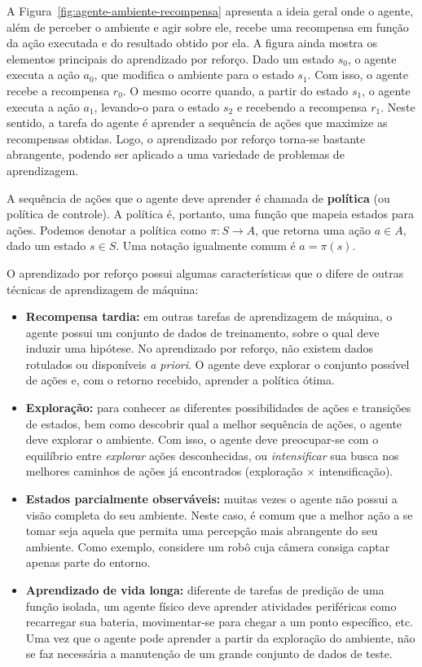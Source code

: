 A Figura~\ref{fig:agente-ambiente-recompensa} apresenta a ideia geral onde o agente, além de perceber o ambiente e agir sobre ele, recebe uma recompensa em função da ação executada e do resultado obtido por ela. A figura ainda mostra os elementos principais do aprendizado por reforço. Dado um estado $s_0$, o agente executa a ação $a_0$, que modifica o ambiente para o estado $s_1$. Com isso, o agente recebe a recompensa $r_0$. O mesmo ocorre quando, a partir do estado $s_1$, o agente executa a ação $a_1$, levando-o para o estado $s_2$ e recebendo a recompensa $r_1$. Neste sentido, a tarefa do agente é aprender a sequência de ações que maximize as recompensas obtidas. Logo, o aprendizado por reforço torna-se bastante abrangente, podendo ser aplicado a uma variedade de problemas de aprendizagem.

A sequência de ações que o agente deve aprender é chamada de \textbf{política} (ou política de controle). A política é, portanto, uma função que mapeia estados para ações. Podemos denotar a política como $\pi : S \rightarrow A$, que retorna uma ação $a \in A$, dado um estado $s \in S$. Uma notação igualmente comum é $a = \pi(s)$.

O aprendizado por reforço possui algumas características que o difere de outras técnicas de aprendizagem de máquina:

\begin{itemize}
	\item \textbf{Recompensa tardia:} em outras tarefas de aprendizagem de máquina, o agente possui um conjunto de dados de treinamento, sobre o qual deve induzir uma hipótese. No aprendizado por reforço, não existem dados rotulados ou disponíveis \textit{a priori}. O agente deve explorar o conjunto possível de ações e, com o retorno recebido, aprender a política ótima.
	
	\item \textbf{Exploração:} para conhecer as diferentes possibilidades de ações e transições de estados, bem como descobrir qual a melhor sequência de ações, o agente deve explorar o ambiente. Com isso, o agente deve preocupar-se com o equilíbrio entre \textit{explorar} ações desconhecidas, ou \textit{intensificar} sua busca nos melhores caminhos de ações já encontrados (exploração $\times$ intensificação).
	
	\item \textbf{Estados parcialmente observáveis:} muitas vezes o agente não possui a visão completa do seu ambiente. Neste caso, é comum que a melhor ação a se tomar seja aquela que permita uma percepção mais abrangente do seu ambiente. Como exemplo, considere um robô cuja câmera consiga captar apenas parte do entorno.
	
	\item \textbf{Aprendizado de vida longa:} diferente de tarefas de predição de uma função isolada, um agente físico deve aprender atividades periféricas como recarregar sua bateria, movimentar-se para chegar a um ponto específico, etc. Uma vez que o agente pode aprender a partir da exploração do ambiente, não se faz necessária a manutenção de um grande conjunto de dados de teste.
\end{itemize}

